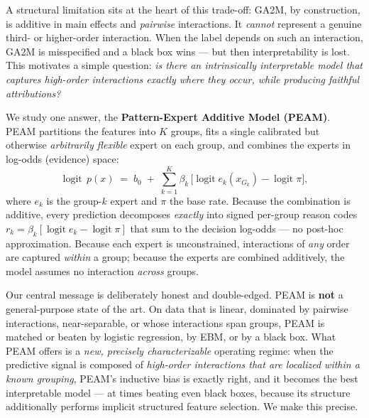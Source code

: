 \documentclass{article}
\newcommand{\logit}{\operatorname{logit}}
\begin{document}
A structural limitation sits at the heart of this trade-off: GA2M, by
construction, is additive in main effects and \emph{pairwise} interactions. It
\emph{cannot} represent a genuine third- or higher-order interaction. When the
label depends on such an interaction, GA2M is misspecified and a black box wins
--- but then interpretability is lost. This motivates a simple question:
\emph{is there an intrinsically interpretable model that captures high-order
interactions exactly where they occur, while producing faithful attributions?}

We study one answer, the \textbf{Pattern-Expert Additive Model (PEAM)}. PEAM
partitions the features into $K$ groups, fits a single calibrated but otherwise
\emph{arbitrarily flexible} expert on each group, and combines the experts in
log-odds (evidence) space:
\begin{equation}
\logit\, p(x) \;=\; b_0 \;+\; \sum_{k=1}^{K} \beta_k\,\big[\logit e_k(x_{G_k}) - \logit \pi\big],
\label{eq:peam-intro}
\end{equation}
where $e_k$ is the group-$k$ expert and $\pi$ the base rate. Because the
combination is additive, every prediction decomposes \emph{exactly} into signed
per-group reason codes $r_k = \beta_k[\logit e_k - \logit \pi]$ that sum to the
decision log-odds --- no post-hoc approximation. Because each expert is
unconstrained, interactions of \emph{any} order are captured \emph{within} a
group; because the experts are combined additively, the model assumes no
interaction \emph{across} groups.

Our central message is deliberately honest and double-edged. PEAM is
\textbf{not} a general-purpose state of the art. On data that is linear,
dominated by pairwise interactions, near-separable, or whose interactions span
groups, PEAM is matched or beaten by logistic regression, by EBM, or by a black
box. What PEAM offers is a \emph{new, precisely characterizable} operating
regime: when the predictive signal is composed of \emph{high-order interactions
that are localized within a known grouping}, PEAM's inductive bias is exactly
right, and it becomes the best interpretable model --- at times beating even
black boxes, because its structure additionally performs implicit structured
feature selection. We make this precise.
\end{document}
